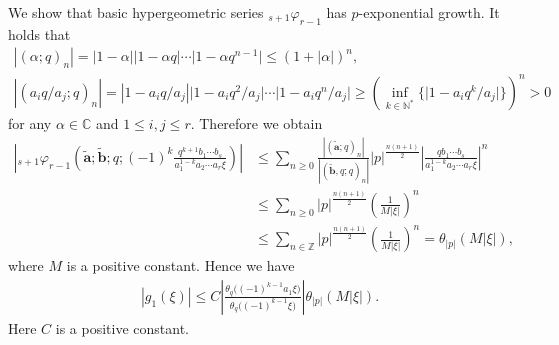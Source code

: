 We show that basic hypergeometric series ${}_{s+1}\varphi_{r-1}$ has $p$-exponential growth. It holds that
\begin{gather*}
|(\alpha;q)_n| =|1-\alpha||1-\alpha q|\cdots\big|1-\alpha q^{n-1}\big|\le(1+|\alpha|)^n,\\
|(a_iq/a_j;q)_n| =|1-a_iq/a_j|\big|1-a_iq^2/a_j\big|\cdots\big|1-a_iq^n/a_j\big|\ge \left(\inf_{k\in\mathbb{N}^*}\big\{\big|1-a_iq^k/a_j\big|\big\}\right)^n>0
\end{gather*}
for any $\alpha\in\mathbb{C}$ and $1\le i,j\le r$. Therefore we obtain
\begin{align*}
\left|{}_{s+1}\varphi_{r-1}\left(\tilde{\bm{a}};\tilde{\bm{b}};q;(-1)^k\frac{q^{k+1}b_1\cdots b_s}{a_1^{1-k}a_2\cdots a_r\xi}\right)\right|&\le\sum_{n\ge0}\frac{|(\tilde{\bm{a}};q)_n|}{|(\tilde{\bm{b}},q;q)_n|}|p|^{\frac{n(n+1)}{2}}\left|\frac{qb_1\cdots b_s}{a_1^{1-k}a_2\cdots a_r\xi}\right|^n\\
&\le\sum_{n\ge0}|p|^{\frac{n(n+1)}{2}}\left(\frac{1}{M|\xi|}\right)^n\\
&\le\sum_{n\in\mathbb{Z}}|p|^{\frac{n(n+1)}{2}}\left(\frac{1}{M|\xi|}\right)^n=\theta_{|p|}(M|\xi|),
\end{align*}
where $M$ is a positive constant. Hence we have
\begin{gather}\label{g1_estimate_1}
|g_1(\xi)|\le C\left|\frac{\theta_q\big((-1)^{k-1}a_1\xi\big)}{\theta_q\big((-1)^{k-1}\xi\big)}\right|\theta_{|p|}(M|\xi|).
\end{gather}
Here $C$ is a positive constant.

